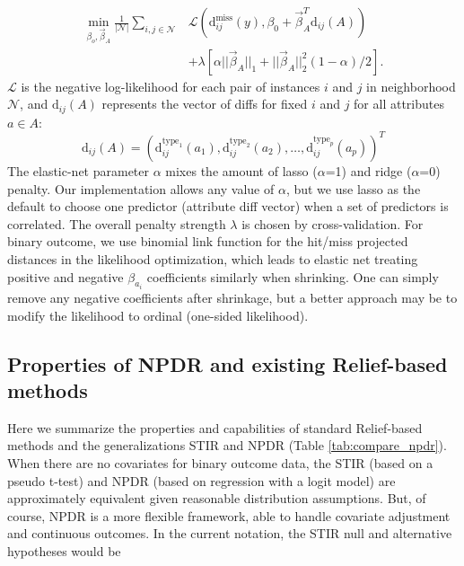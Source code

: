 \documentclass[10pt]{article}
\begin{document}
\begin{equation}\label{eq:glmnetNPDR}
\begin{aligned}
    \min_{\beta_o, \vec{\beta}_A} \frac{1}{|\mathcal{N}|}  \sum_{i,j \in \mathcal{N}} & 
           \mathcal{L} \left(\text{d}^{\text{miss}}_{ij}(y), \beta_0 + \vec{\beta}_A^{T} \text{d}_{ij}(A) \right)
     \\ \nonumber
     & + \lambda \left[ \alpha || \vec{\beta}_A ||_1 + || \vec{\beta}_A ||_2^2 (1-\alpha)/2  \right].
\end{aligned}
\end{equation}
$\mathcal{L}$ is the negative log-likelihood for each pair of instances $i$ and $j$ in neighborhood $\mathcal{N}$, and $\text{d}_{ij}(A)$ represents the vector of diffs for fixed $i$ and $j$ for all attributes $a \in A$: 
\begin{equation}
\text{d}_{ij}(A)= \left( \text{d}^{\text{type}_1}_{ij}(a_1), \text{d}^{\text{type}_2}_{ij}(a_2), \ldots, \text{d}^{\text{type}_p}_{ij}(a_p) \right)^{T}
\end{equation}
The elastic-net parameter $\alpha$ mixes the amount of lasso ($\alpha$=1) and ridge ($\alpha$=0) penalty. Our implementation allows any value of $\alpha$, but we use lasso as the default to choose one predictor (attribute diff vector) when a set of predictors is correlated. The overall penalty strength $\lambda$ is chosen by cross-validation. For binary outcome, we use binomial link function for the hit/miss projected distances in the likelihood optimization, which leads to elastic net treating positive and negative $\beta_{a_i}$ coefficients similarly when shrinking. One can simply remove any negative coefficients after shrinkage, but a better approach may be to modify the likelihood to ordinal (one-sided likelihood).   

\subsection{Properties of NPDR and existing Relief-based methods}
Here we summarize the properties and capabilities of standard Relief-based methods and the generalizations STIR and NPDR (Table \ref{tab:compare_npdr}). When there are no covariates for binary outcome data, the STIR (based on a pseudo t-test) and NPDR (based on regression with a logit model) are approximately equivalent given reasonable distribution assumptions.
But, of course, NPDR is a more flexible framework, able to handle covariate adjustment and continuous outcomes. In the current notation, the STIR null and alternative hypotheses would be
\end{document}

